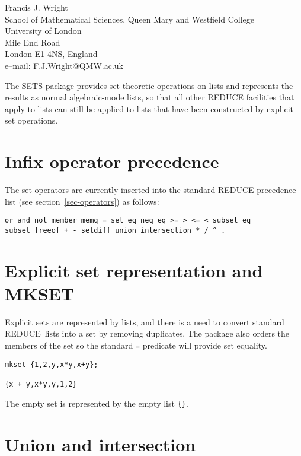 \documentclass[11pt,letterpaper]{book}
\makeatletter
\newcommand{\REDUCE}{REDUCE}
\newcommand{\underscore}{\_}
\newcommand{\ttindex}[1]{{\renewcommand{\_}{\protect\underscore}%
                          \index{#1@{\tt #1}}}}
\makeatother
\begin{document}
{\footnotesize
\begin{center}
Francis J. Wright \\
School of Mathematical Sciences, Queen Mary and Westfield College \\
University of London \\
Mile End Road \\
London E1 4NS, England \\[0.05in]
e--mail: F.J.Wright@QMW.ac.uk
\end{center}
}
\ttindex{SETS}

The SETS package provides set theoretic operations on lists and represents
the results as normal algebraic-mode lists, so that all other \REDUCE{}
facilities that apply to lists can still be applied to lists that have
been constructed by explicit set operations.

\section{Infix operator precedence}

The set operators are currently inserted into the standard \REDUCE{}
precedence list (see section~\ref{sec-operators}) as follows:
{\small\begin{verbatim}
or and not member memq = set_eq neq eq >= > <= < subset_eq
subset freeof + - setdiff union intersection * / ^ .
\end{verbatim}}

\section{Explicit set representation and MKSET}

Explicit sets are represented by lists, and there is a need to convert
standard \REDUCE\ lists into a set by removing duplicates.  The
package also orders the members of the set so the standard {\tt =}
predicate will provide set equality.\ttindex{MKSET}
{\small\begin{verbatim}
mkset {1,2,y,x*y,x+y};

{x + y,x*y,y,1,2}
\end{verbatim}}

The empty set is represented by the empty list \verb|{}|.

\section{Union and intersection}
\end{document}
